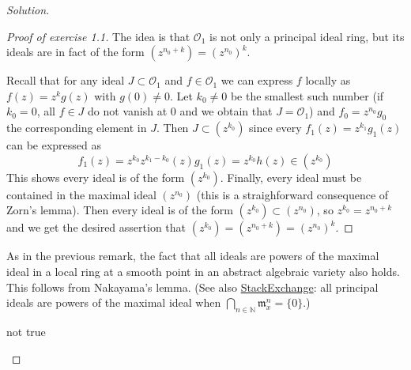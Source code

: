 \begin{proof}[Solution]
\begin{proof}[Proof of exercise 1.1]
The idea is that $\mathcal{O}_1$ is not only a principal ideal ring, but its ideals are in fact of the form $(z^{n_0+k})=(z^{n_0})^k$.

Recall that for any ideal  $J \subset \mathcal{O}_1$ and $f\in\mathcal{O}_1$ we can express $f$ locally as $f(z)=z^kg(z)$ with $g(0)\neq 0$. Let $k_0\neq 0$ be the smallest such number (if $k_0=0$, all $f\in J$ do not vanish at $0$ and we obtain that $J=\mathcal{O}_1$) and $f_0=z^{n_0}g_0$ the corresponding element in $J$. Then $J \subset (z^{k_0})$ since every $f_1(z)=z^{k_1}g_1(z)$ can be expressed as 
\[f_1(z)=z^{k_0}z^{k_1-k_0}(z)g_1(z)=z^{k_0}h(z)\in(z^{k_0})\]
This shows every ideal is of the form $(z^{k_0})$. Finally, every ideal must be contained in the maximal ideal $(z^{n_0})$ (this is a straighforward consequence of Zorn's lemma). Then every ideal is of the form $(z^{k_0})\subset(z^{n_0})$, so $z^{k_0}=z^{n_0+k}$ and we get the desired assertion that $(z^{k_0})=(z^{n_0+k})=(z^{n_0})^k$.
	\end{proof}

	\begin{remark}[by Altan]\leavevmode
	As in the previous remark, the fact that all ideals are powers of the maximal ideal in a local ring at a smooth point in an abstract algebraic variety also holds. This follows from Nakayama's lemma. (See also \href{https://math.stackexchange.com/questions/704613/local-ring-with-principal-maximal-ideal}{StackExchange}: all principal ideals are powers of the maximal ideal when  $ \bigcap_{n \in \mathbb{N}} \mathfrak{m}_x^n=\{0\}$.)
\end{remark}

\begin{remark}\leavevmode
	not true
\end{remark}
\end{proof}

